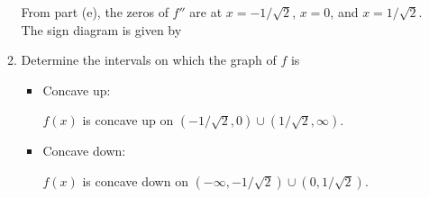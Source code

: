 \documentclass[12pt]{article}
\newcommand{\points}[1]{\marginpar{\hspace{24pt}[#1]}}
\begin{document}
\begin{enumerate}
\begin{enumerate}
\medskip

From part (e), the zeros of $f''$ are at $x=-1/\sqrt{2}$, $x=0$, and $x=1/\sqrt{2}$. The sign diagram is given by
\begin{center}
\end{center}

 \item Determine the intervals on which the graph of $f$ is\points{2}
\begin{itemize}
 \item Concave up:

\medskip

$f(x)$ is concave up on $(-1/\sqrt{2},0)\cup (1/\sqrt{2},\infty)$.

\medskip

 \item Concave down:

\medskip

$f(x)$ is concave down on $(-\infty, -1/\sqrt{2})\cup(0,1/\sqrt{2})$.
\end{itemize}

\end{enumerate}

\end{enumerate}
\end{document}
